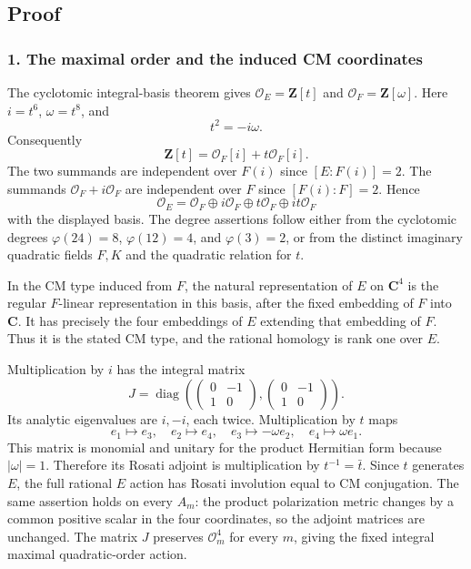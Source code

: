 \subsection{Proof}\label{proof}

\subsubsection{1. The maximal order and the induced CM coordinates}\label{the-maximal-order-and-the-induced-cm-coordinates}

The cyclotomic integral-basis theorem gives \(\mathcal O_E=\mathbf Z[t]\) and \(\mathcal O_F=\mathbf Z[\omega]\). Here \(i=t^6\), \(\omega=t^8\), and \[
 t^2=-i\omega.
\] Consequently \[
 \mathbf Z[t]=\mathcal O_F[i]+t\mathcal O_F[i].
\] The two summands are independent over \(F(i)\) since \([E:F(i)]=2\). The summands \(\mathcal O_F+i\mathcal O_F\) are independent over \(F\) since \([F(i):F]=2\). Hence \[
 \mathcal O_E=\mathcal O_F\oplus i\mathcal O_F
               \oplus t\mathcal O_F\oplus it\mathcal O_F
\tag{B25a.5}
\] with the displayed basis. The degree assertions follow either from the cyclotomic degrees \(\varphi(24)=8\), \(\varphi(12)=4\), and \(\varphi(3)=2\), or from the distinct imaginary quadratic fields \(F,K\) and the quadratic relation for \(t\).

In the CM type induced from \(F\), the natural representation of \(E\) on \(\mathbf C^4\) is the regular \(F\)-linear representation in this basis, after the fixed embedding of \(F\) into \(\mathbf C\). It has precisely the four embeddings of \(E\) extending that embedding of \(F\). Thus it is the stated CM type, and the rational homology is rank one over \(E\).

Multiplication by \(i\) has the integral matrix \[
 J=\operatorname{diag}\left(
 \begin{pmatrix}0&-1\\1&0\end{pmatrix},
 \begin{pmatrix}0&-1\\1&0\end{pmatrix}\right).
\tag{B25a.6}
\] Its analytic eigenvalues are \(i,-i\), each twice. Multiplication by \(t\) maps \[
 e_1\mapsto e_3,\quad e_2\mapsto e_4,\quad
 e_3\mapsto-\omega e_2,\quad e_4\mapsto\omega e_1.
\tag{B25a.7}
\] This matrix is monomial and unitary for the product Hermitian form because \(|\omega|=1\). Therefore its Rosati adjoint is multiplication by \(t^{-1}=\bar t\). Since \(t\) generates \(E\), the full rational \(E\) action has Rosati involution equal to CM conjugation. The same assertion holds on every \(A_m\): the product polarization metric changes by a common positive scalar in the four coordinates, so the adjoint matrices are unchanged. The matrix \(J\) preserves \(\mathcal O_m^4\) for every \(m\), giving the fixed integral maximal quadratic-order action.

